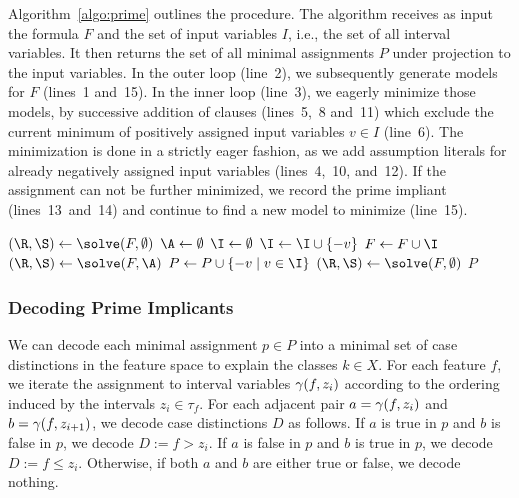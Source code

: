 \documentclass{easychair}
\theoremstyle{definition}
\begin{document}
Algorithm~\ref{algo:prime} outlines the procedure. 
The algorithm receives as input the formula $F$ and the set of input variables $I$, i.e., the set of all interval variables. 
It then returns the set of all minimal assignments $P$ under projection to the input variables. 
In the outer loop (line~2), we subsequently generate models for $F$ (lines~1 and~15). 
In the inner loop (line~3), we eagerly minimize those models, by successive addition of clauses (lines~5,~8 and~11) which exclude the current minimum of positively assigned input variables $v \in I$ (line~6). 
The minimization is done in a strictly eager fashion, as we add assumption literals for already negatively assigned input variables (lines~4,~10, and~12). 
If the assignment can not be further minimized, we record the prime impliant (lines~13~and~14) and continue to find a new model to minimize (line~15). 

\begin{algorithm}
\caption{Incremental Computation of Prime Implicants}
\label{algo:prime}
\DontPrintSemicolon



\BlankLine

$(\R,\S) \leftarrow \solve(F, \emptyset)$ \;
\While {\R} {
	\While {\R} {
		$\A \leftarrow \emptyset$ \;
		$\I \leftarrow \emptyset$ \;
		 {
			 {
				$\I \leftarrow \I \cup \{ -v \}$ \;
			}
		}
		$F \leftarrow F \cup \I$ \;
		$(\R,\S) \leftarrow \solve(F, \A)$ \;
		 {
			$P \leftarrow P \cup \{ -v \mid v \in \I \}$ \;
		}
	}
	$(\R,\S) \leftarrow \solve(F, \emptyset)$ \;
}
\Return $P$ \;
\end{algorithm}


\subsubsection{Decoding Prime Implicants}
\label{sec:approach:dec}

We can decode each minimal assignment $p \in P$ into a minimal set of case distinctions in the feature space to explain the classes $k \in X$. 
For each feature $f$, we iterate the assignment to interval variables $\gamma(f,z_i)$ according to the ordering induced by the intervals $z_i \in \tau_f$. 
For each adjacent pair $a=\gamma(f,z_i)$ and $b=\gamma(f,z_{i+1})$, we decode case distinctions $D$ as follows. 
If $a$ is true in $p$ and $b$ is false in $p$, we decode $D := f > z_i$. 
If $a$ is false in $p$ and $b$ is true in $p$, we decode $D := f \leq z_i$. 
Otherwise, if both $a$ and $b$ are either true or false, we decode nothing. 
\end{document}
